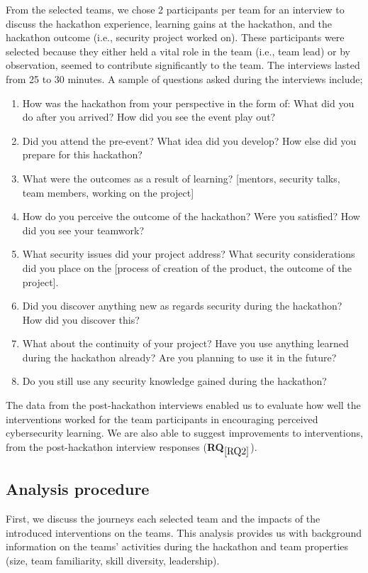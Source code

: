 \documentclass[runningheads]{llncs}
\newcommand{\hr}[1]{\textbf{RQ}$_{\ref{#1}}$}
\begin{document}
From the selected teams, we chose 2 participants per team for an interview to discuss the hackathon experience, learning gains at the hackathon, and the hackathon outcome (i.e., security project worked on). 
These participants were selected because they either held a vital role in the team (i.e., team lead) or by observation, seemed to contribute significantly to the team.
The interviews lasted from 25 to 30 minutes.
A sample of questions asked during the interviews include;
\begin{enumerate}
    \item How was the hackathon from your perspective in the form of: What did you do after you arrived? How did you see the event play out? 
    \item Did you attend the pre-event? What idea did you develop? How else did you prepare for this hackathon?
    \item What were the outcomes as a result of learning? [mentors, security talks, team members, working on the project]
    \item How do you perceive the outcome of the hackathon? Were you satisfied? How did you see your teamwork? 
    \item What security issues did your project address? What security considerations did you place on the [process of creation of the product, the outcome of the project].
    \item Did you discover anything new as regards security during the hackathon? How did you discover this?
    \item What about the continuity of your project? Have you use anything learned during the hackathon already? Are you planning to use it in the future? 
    \item Do you still use any security knowledge gained during the hackathon?
\end{enumerate}
The data from the post-hackathon interviews enabled us to evaluate how well the interventions worked for the team participants in encouraging perceived cybersecurity learning. 
We are also able to suggest improvements to interventions, from the post-hackathon interview responses (\hr{RQ2}).

\subsection{Analysis procedure}\label{Sec:analysisprocedure}
First, we discuss the journeys each selected team and the impacts of the introduced interventions on the teams. This analysis provides us with background information on the teams' activities during the hackathon and team properties (size, team familiarity, skill diversity, leadership).
\end{document}
